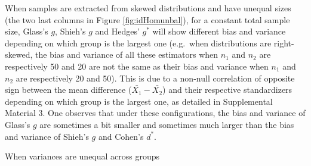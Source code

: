 \documentclass[
  12pt,
  french,
]{article}
\begin{document}
When samples are extracted from skewed distributions and have unequal
sizes (the two last columns in Figure \ref{fig:idHomunbal}), for a
constant total sample size, Glass's \(g\), Shieh's \(g\) and Hedges'
\(g^*\) will show different bias and variance depending on which group
is the largest one (e.g.~when distributions are right-skewed, the bias
and variance of all these estimators when \(n_1\) and \(n_2\) are
respectively 50 and 20 are not the same as their bias and variance when
\(n_1\) and \(n_2\) are respectively 20 and 50). This is due to a
non-null correlation of opposite sign between the mean difference
(\(\bar{X_1}-\bar{X_2}\)) and their respective standardizers depending
on which group is the largest one, as detailed in Supplemental Material
3. One observes that under these configurations, the bias and variance
of Glass's \(g\) are sometimes a bit smaller and sometimes much larger
than the bias and variance of Shieh's \(g\) and Cohen's \(d^*\).

When variances are unequal across groups
\end{document}
